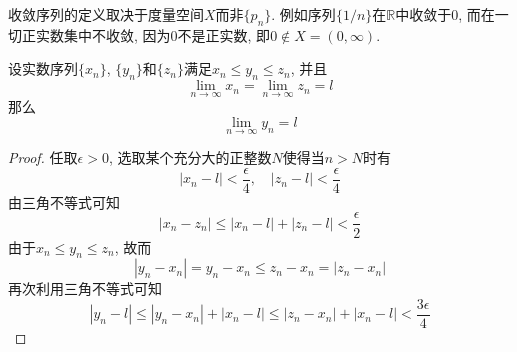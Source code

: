 \documentclass[cn,12pt,math=mtpro2,citestyle=gb7714-2015,bibstyle=gb7714-2015,twocol]{elegantbook}
\newcommand{\R}{\mathbb{R}}
\newcommand{\limn }{\lim_{n\to\infty}}
\begin{document}
\begin{remark}
收敛序列的定义取决于度量空间$X$而非$\{p_n\}$. 例如序列$\{1/n\}$在$\R$中收敛于0, 而在一切正实数集中不收敛, 因为$0$不是正实数, 即$0\not\in X=(0,\infty)$.
\end{remark}

\begin{theorem}[迫敛定理]
设实数序列$\{x_n\}$, $\{y_n\}$和$\{z_n\}$满足$x_n\leq y_n\leq z_n$, 并且
$$\limn x_n=\limn z_n=l$$
那么$$\limn y_n=l$$
\end{theorem}
\begin{proof}
  任取$\epsilon>0$, 选取某个充分大的正整数$N$使得当$n>N$时有
  $$|x_n-l|<\frac{\epsilon}{4}, \quad |z_n-l|<\frac{\epsilon}{4}$$
  由三角不等式可知
  $$|x_n-z_n|\leq |x_n-l|+|z_n-l|<\frac{\epsilon}{2}$$
  由于$x_n\leq y_n\leq z_n$, 故而
  $$|y_n-x_n|=y_n-x_n \leq z_n-x_n=|z_n-x_n|$$
  再次利用三角不等式可知
  $$|y_n-l|\leq |y_n-x_n|+|x_n-l|\leq |z_n-x_n|+|x_n-l|<\frac{3\epsilon}{4}$$
\end{proof}
\end{document}
